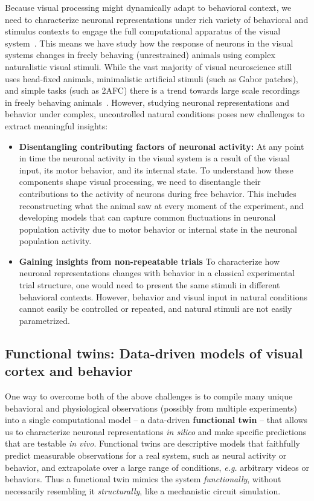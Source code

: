 \documentclass[B2,COG]{ercgrant}
\begin{document}
Because visual processing might dynamically adapt to behavioral context, we need to characterize neuronal representations under rich variety of behavioral and stimulus contexts to engage the full computational apparatus of the visual system~\parencite{Huk2018-ez, Datta2019-qj}. 
This means we have study how the response of neurons in the visual systems changes in freely behaving (unrestrained) animals using complex naturalistic visual stimuli.
While the vast majority of visual neuroscience still uses head-fixed animals, minimalistic artificial stimuli (such as Gabor patches), and simple tasks (such as 2AFC) there is a trend towards large scale recordings in freely behaving 
 animals~\parencite[\eg][]{Parker2022-ac}.
However, studying neuronal representations and behavior under complex, uncontrolled natural conditions poses new challenges to extract meaningful insights:
\begin{itemize}
    \item \textbf{Disentangling contributing factors of neuronal activity:} At any point in time the neuronal activity in the visual system is a result of the visual input, its motor behavior, and its internal state. 
    To understand how these components shape visual processing, we need to disentangle their contributions to the activity of neurons during free behavior. 
    This includes reconstructing what the animal saw at every moment of the experiment, and developing models that can capture common fluctuations in neuronal population activity due to motor behavior or internal state in the neuronal population activity.
    \item \textbf{Gaining insights from non-repeatable trials} 
    To characterize how neuronal representations changes with behavior in a classical experimental trial structure, one would need to present the same stimuli in different behavioral contexts. 
    However, behavior and visual input in natural conditions cannot easily be controlled or repeated, and natural stimuli are not easily parametrized.
\end{itemize}



\subsection{Functional twins: Data-driven models of visual cortex and behavior}
One way to overcome both of the above challenges is to compile many unique behavioral and physiological observations (possibly from multiple experiments) into a single computational model -- a data-driven \textbf{functional twin} -- that allows us to characterize neuronal representations \textit{in silico} and make specific predictions that are testable \textit{in vivo}. 
Functional twins are descriptive models that faithfully predict measurable observations for a real system, such as neural activity or behavior, and extrapolate over a large range of conditions, \textit{e.g.} arbitrary videos or behaviors. 
Thus a functional twin mimics the system \textit{functionally}, without necessarily resembling it \textit{structurally}, like a mechanistic circuit simulation.  
\end{document}
